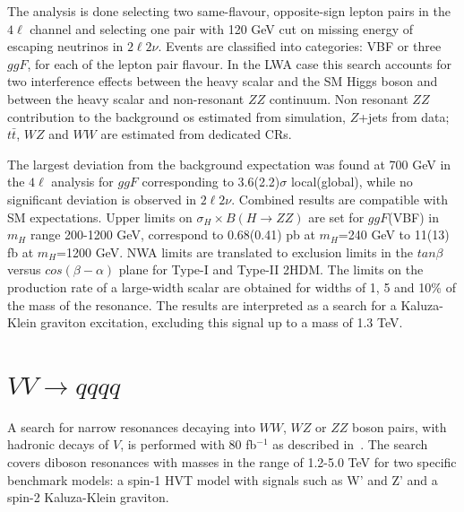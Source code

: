 \documentclass{PoS}
\begin{document}
The analysis is done selecting two same-flavour, opposite-sign lepton pairs in the $4\ell$ channel and selecting one pair with 120 GeV cut on missing energy of escaping neutrinos in $2\ell2\nu$.
Events are classified into categories: VBF or three $ggF$, for each of the lepton pair flavour.
In the LWA case this search accounts for two interference effects between the heavy scalar and the SM Higgs boson and between the heavy scalar and non-resonant $ZZ$ continuum.
Non resonant $ZZ$ contribution to the background os estimated from simulation, $Z$+jets from data; $t\bar{t}$, $WZ$ and $WW$ are estimated from dedicated CRs.

The largest deviation from the background expectation was found at 700 GeV in the $4\ell$ analysis for $ggF$ corresponding to 3.6(2.2)$\sigma$ local(global), while no significant deviation is observed in $2\ell2\nu$. Combined results are compatible with SM expectations. 
Upper limits on $\sigma_H \times B(H\rightarrow ZZ)$ are set for $ggF$(VBF) in $m_H$ range 200-1200 GeV, correspond to 0.68(0.41) pb at $m_H$=240 GeV to 11(13) fb at $m_H$=1200 GeV. NWA limits are translated to exclusion limits in the $tan \beta$ versus $cos(\beta-\alpha)$ plane for Type-I and Type-II 2HDM. The limits on the production rate of a large-width scalar are obtained for widths of 1, 5 and 10\% of the mass of the resonance.
The results are interpreted as a search for a Kaluza-Klein graviton excitation, excluding this signal up to a mass of 1.3 TeV. 


\section{$VV\rightarrow qqqq$}
\label{sec:VV}
A search for narrow resonances decaying into $WW$, $WZ$ or $ZZ$ boson pairs, with hadronic decays of $V$, is performed with 80 fb$^{-1}$ as described in~\cite{ATLAS-CONF-2018-016}. The search covers diboson resonances with masses in the range of 1.2-5.0 TeV for two specific benchmark models: a spin-1 HVT model with signals such as W' and Z' and a spin-2 Kaluza-Klein graviton.
\end{document}
